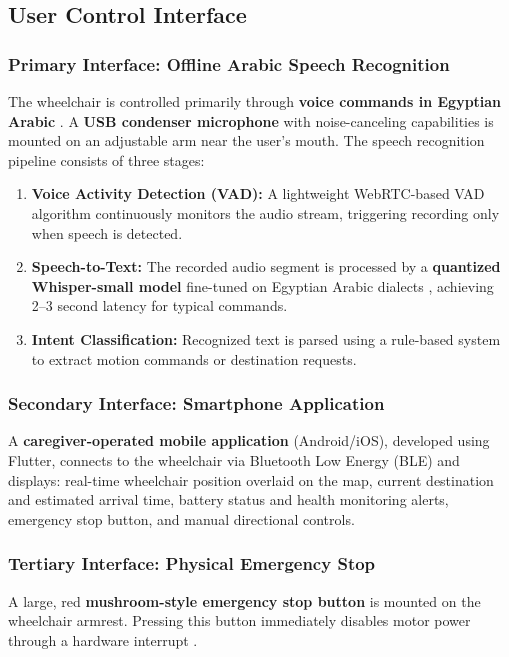 \documentclass[12pt,a4paper]{report}
\begin{document}
\subsection{User Control Interface}

\subsubsection{Primary Interface: Offline Arabic Speech Recognition}

The wheelchair is controlled primarily through \textbf{voice commands in Egyptian Arabic} . A \textbf{USB condenser microphone} with noise-canceling capabilities is mounted on an adjustable arm near the user's mouth. The speech recognition pipeline consists of three stages:

\begin{enumerate}
    \item \textbf{Voice Activity Detection (VAD):} A lightweight WebRTC-based VAD algorithm continuously monitors the audio stream, triggering recording only when speech is detected.
    \item \textbf{Speech-to-Text:} The recorded audio segment is processed by a \textbf{quantized Whisper-small model} fine-tuned on Egyptian Arabic dialects , achieving 2--3 second latency for typical commands.
    \item \textbf{Intent Classification:} Recognized text is parsed using a rule-based system to extract motion commands or destination requests.
\end{enumerate}

\subsubsection{Secondary Interface: Smartphone Application}

A \textbf{caregiver-operated mobile application} (Android/iOS), developed using Flutter, connects to the wheelchair via Bluetooth Low Energy (BLE) and displays: real-time wheelchair position overlaid on the map, current destination and estimated arrival time, battery status and health monitoring alerts, emergency stop button, and manual directional controls.

\subsubsection{Tertiary Interface: Physical Emergency Stop}

A large, red \textbf{mushroom-style emergency stop button} is mounted on the wheelchair armrest. Pressing this button immediately disables motor power through a hardware interrupt \cite{iso13482}.
\end{document}
